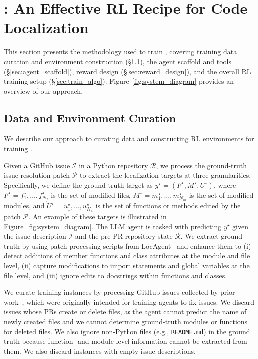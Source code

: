 
\section{\methodname: An Effective RL Recipe for Code Localization}

This section presents the methodology used to train \methodname, covering training data curation and environment construction (\S\ref{sec:data_creation}), the agent scaffold and tools (\S\ref{sec:agent_scaffold}), reward design (\S\ref{sec:reward_design}), and the overall RL training setup (\S\ref{sec:train_algo}). Figure~\ref{fig:system_diagram} provides an overview of our approach.

\subsection{Data and Environment Curation}
\label{sec:data_creation}
We describe our approach to curating data and constructing RL environments for training \methodname.

Given a GitHub issue $\mathcal{I}$ in a Python repository $\mathcal{R}$, we process the ground-truth issue resolution patch $\mathcal{P}$ to extract the localization targets at three granularities. Specifically, we define the ground-truth target as $y^{\star} = (F^{\star}, M^{\star}, U^{\star})$, where $F^{\star} = {f_1^{\star}, \dots, f_{N_f}^{\star}}$ is the set of modified files, $M^{\star} = {m_1^{\star}, \dots, m_{N_m}^{\star}}$ is the set of modified modules, and $U^{\star} = {u_1^{\star}, \dots, u_{N_u}^{\star}}$ is the set of functions or methods edited by the patch $\mathcal{P}$. An example of these targets is illustrated in Figure~\ref{fig:system_diagram}. The LLM agent is tasked with predicting $y^{\star}$ given the issue description $\mathcal{I}$ and the pre-PR repository state $\mathcal{R}$. We extract ground truth by using patch-processing scripts from LocAgent~\citep{chen-etal-2025-locagent} and enhance them to (i) detect additions of member functions and class attributes at the module and file level, (ii) capture modifications to import statements and global variables at the file level, and (iii) ignore edits to docstrings within functions and classes.

We curate training instances by processing GitHub issues collected by prior work~\citep{yang2025swesmithscalingdatasoftware, pan2025trainingsoftwareengineeringagents}, which were originally intended for training agents to fix issues. We discard issues whose PRs create or delete files, as the agent cannot predict the name of newly created files and we cannot determine ground-truth modules or functions for deleted files. We also ignore non-Python files (e.g., \texttt{README.md}) in the ground truth because function- and module-level information cannot be extracted from them. We also discard instances with empty issue descriptions.

